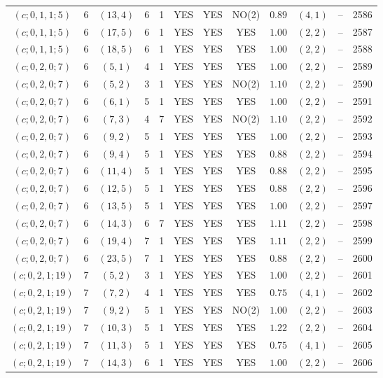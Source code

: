 \begin{longtable}{|c|c|c|c|c|c|c|c|c|c|c|c|}
$(c;0,1,1;5)$ & 6 & $(13,4)$ & 6 & 1 & YES & YES & NO(2) & $0.89$ & $(4,1)$ & -- & 2586\\
$(c;0,1,1;5)$ & 6 & $(17,5)$ & 6 & 1 & YES & YES & YES & $1.00$ & $(2,2)$ & -- & 2587\\
$(c;0,1,1;5)$ & 6 & $(18,5)$ & 6 & 1 & YES & YES & YES & $1.00$ & $(2,2)$ & -- & 2588\\
$(c;0,2,0;7)$ & 6 & $(5,1)$ & 4 & 1 & YES & YES & YES & $1.00$ & $(2,2)$ & -- & 2589\\
$(c;0,2,0;7)$ & 6 & $(5,2)$ & 3 & 1 & YES & YES & NO(2) & $1.10$ & $(2,2)$ & -- & 2590\\
$(c;0,2,0;7)$ & 6 & $(6,1)$ & 5 & 1 & YES & YES & YES & $1.00$ & $(2,2)$ & -- & 2591\\
$(c;0,2,0;7)$ & 6 & $(7,3)$ & 4 & 7 & YES & YES & NO(2) & $1.10$ & $(2,2)$ & -- & 2592\\
$(c;0,2,0;7)$ & 6 & $(9,2)$ & 5 & 1 & YES & YES & YES & $1.00$ & $(2,2)$ & -- & 2593\\
$(c;0,2,0;7)$ & 6 & $(9,4)$ & 5 & 1 & YES & YES & YES & $0.88$ & $(2,2)$ & -- & 2594\\
$(c;0,2,0;7)$ & 6 & $(11,4)$ & 5 & 1 & YES & YES & YES & $0.88$ & $(2,2)$ & -- & 2595\\
$(c;0,2,0;7)$ & 6 & $(12,5)$ & 5 & 1 & YES & YES & YES & $0.88$ & $(2,2)$ & -- & 2596\\
$(c;0,2,0;7)$ & 6 & $(13,5)$ & 5 & 1 & YES & YES & YES & $1.00$ & $(2,2)$ & -- & 2597\\
$(c;0,2,0;7)$ & 6 & $(14,3)$ & 6 & 7 & YES & YES & YES & $1.11$ & $(2,2)$ & -- & 2598\\
$(c;0,2,0;7)$ & 6 & $(19,4)$ & 7 & 1 & YES & YES & YES & $1.11$ & $(2,2)$ & -- & 2599\\
$(c;0,2,0;7)$ & 6 & $(23,5)$ & 7 & 1 & YES & YES & YES & $0.88$ & $(2,2)$ & -- & 2600\\
$(c;0,2,1;19)$ & 7 & $(5,2)$ & 3 & 1 & YES & YES & YES & $1.00$ & $(2,2)$ & -- & 2601\\
$(c;0,2,1;19)$ & 7 & $(7,2)$ & 4 & 1 & YES & YES & YES & $0.75$ & $(4,1)$ & -- & 2602\\
$(c;0,2,1;19)$ & 7 & $(9,2)$ & 5 & 1 & YES & YES & NO(2) & $1.00$ & $(2,2)$ & -- & 2603\\
$(c;0,2,1;19)$ & 7 & $(10,3)$ & 5 & 1 & YES & YES & YES & $1.22$ & $(2,2)$ & -- & 2604\\
$(c;0,2,1;19)$ & 7 & $(11,3)$ & 5 & 1 & YES & YES & YES & $0.75$ & $(4,1)$ & -- & 2605\\
$(c;0,2,1;19)$ & 7 & $(14,3)$ & 6 & 1 & YES & YES & YES & $1.00$ & $(2,2)$ & -- & 2606\\

\end{longtable}
